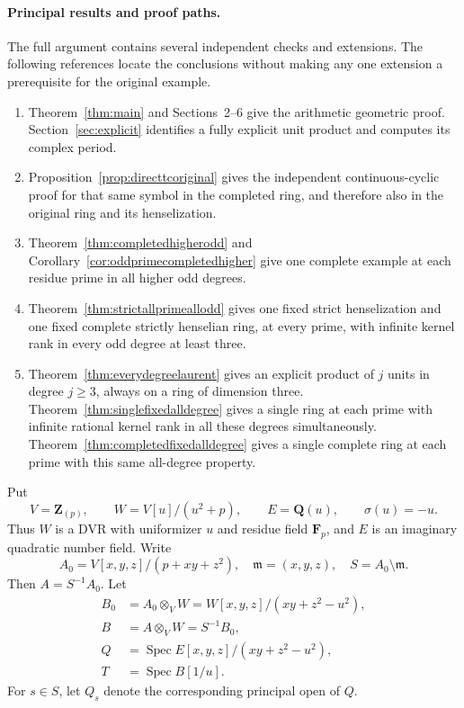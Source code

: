 \documentclass[11pt,a4paper]{article}
\theoremstyle{remark}
\newcommand{\Q}{\mathbf Q}
\newcommand{\Z}{\mathbf Z}
\newcommand{\F}{\mathbf F}
\newcommand{\m}{\mathfrak m}
\newcommand{\Spec}{\operatorname{Spec}}
\begin{document}
\paragraph{Principal results and proof paths.}
The full argument contains several independent checks and extensions.
The following references locate the conclusions without making any
one extension a prerequisite for the original example.
\begin{enumerate}
\item Theorem~\ref{thm:main} and Sections~2--6 give the arithmetic
geometric proof. Section~\ref{sec:explicit} identifies a fully explicit
unit product and computes its complex period.
\item Proposition~\ref{prop:directtcoriginal} gives the independent
continuous-cyclic proof for that same symbol in the completed ring,
and therefore also in the original ring and its henselization.
\item Theorem~\ref{thm:completedhigherodd} and
Corollary~\ref{cor:oddprimecompletedhigher} give one complete example
at each residue prime in all higher odd degrees.
\item Theorem~\ref{thm:strictallprimeallodd} gives one fixed strict
henselization and one fixed complete strictly henselian ring, at every
prime, with infinite kernel rank in every odd degree at least three.
\item Theorem~\ref{thm:everydegreelaurent} gives an explicit product
of $j$ units in degree $j\geq3$, always on a ring of dimension three.
Theorem~\ref{thm:singlefixedalldegree} gives a single ring at each prime
with infinite rational kernel rank in all these degrees simultaneously.
Theorem~\ref{thm:completedfixedalldegree} gives a single complete
ring at each prime with this same all-degree property.
\end{enumerate}


Put
\[
V=\Z_{(p)},\qquad W=V[u]/(u^2+p),\qquad E=\Q(u),\qquad \sigma(u)=-u.
\]
Thus $W$ is a DVR with uniformizer $u$ and residue field $\F_p$, and $E$ is an imaginary quadratic number field. Write
\[
A_0=V[x,y,z]/(p+xy+z^2),\quad \m=(x,y,z),\quad S=A_0\setminus\m.
\]
Then $A=S^{-1}A_0$. Let
\begin{align*}
B_0&=A_0\otimes_VW=W[x,y,z]/(xy+z^2-u^2),\\
B&=A\otimes_VW=S^{-1}B_0,\\
Q&=\Spec E[x,y,z]/(xy+z^2-u^2),\\
T&=\Spec B[1/u].
\end{align*}
For $s\in S$, let $Q_s$ denote the corresponding principal open of $Q$.
\end{document}
